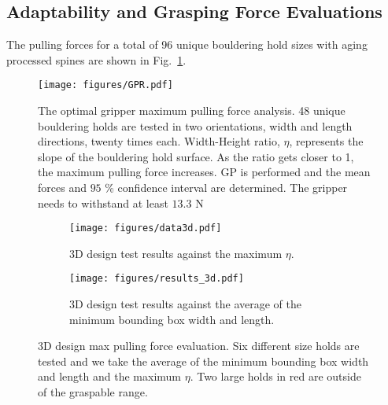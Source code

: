 \documentclass[letterpaper, 10 pt, conference]{ieeeconf}  %
\newcommand{\fig}[1]{Fig.~\ref{#1}}
\begin{document}
\subsection{Adaptability and Grasping Force Evaluations \label{sec:evaluation}}
 The pulling forces for a total of 96 unique bouldering hold sizes with aging processed spines are shown in \fig{fig:result_modeled}. 
 
 \begin{figure}
    \centering
    \texttt{[image: figures/GPR.pdf]}
     \caption{The optimal gripper maximum pulling force analysis. 48 unique bouldering holds are tested in two orientations, width and length directions, twenty times each. Width-Height ratio, $\eta$, represents the slope of the bouldering hold surface. As the ratio gets closer to 1, the maximum pulling force increases. GP is performed and the mean forces and $95$  \% confidence interval are determined. The gripper needs to withstand at least $13.3$ N}\label{fig:result_modeled}
\end{figure} 


\begin{figure}
\begin{subfigure}{0.24\textwidth}
         \centering
   \texttt{[image: figures/data3d.pdf]}
   \caption{3D design test results against the maximum $\eta$.\label{fig:result_3d_eta}}
     \end{subfigure}
    \begin{subfigure}{0.24\textwidth}
    \centering
\texttt{[image: figures/results\_3d.pdf]}
\caption{3D design test results against the average of the minimum bounding box width and length.\label{fig:result_3d_avg}}
    \end{subfigure}
     
     \caption{3D design max pulling force evaluation. Six different size holds are tested and we take the average of the minimum bounding box width and length and the maximum $\eta$. Two large holds in red are outside of the graspable range.\label{fig:3D} }
\end{figure} 
\end{document}
